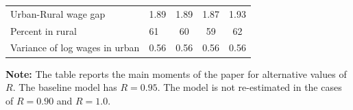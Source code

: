 \documentclass[12pt,pdftex]{article}
\begin{document}
\begin{table}[!htb]
\begin{center}
\begin{tabular}{l l c c c}
\hline
Urban-Rural wage gap                                                & 1.89              & 1.89              & 1.87              & 1.93  \\
Percent in rural                                                    & \phantom{0.}61    & \phantom{0.}60    & \phantom{0.}59    &  \phantom{0.} 62 \\
Variance of log wages in urban                                      & 0.56              & 0.56              &  0.56             &      0.56      \\
\hline
\end{tabular}
\parbox[c]{6.5in}{%
{\footnotesize  \vspace{0.3cm} \textbf{Note:} The table reports the main moments of the paper for alternative values of $R$.
 The baseline model has $R=0.95$. The model is not re-estimated in the cases of $R=0.90$ and $R=1.0$.}
}
\end{center}
\end{table}
\end{document}
